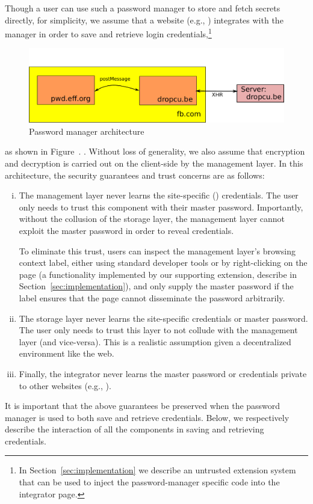 %
Though a user can use such a password manager to store and fetch secrets
directly, for simplicity, we assume that a website (e.g., )
integrates with the manager in order to save and retrieve login
credentials,\footnote{ In Section~\ref{sec:implementation} we describe an
  untrusted extension system that can be used to inject the password-manager
  specific code into the integrator page.  }
\iffigures
\begin{figure}
\begin{center}
\includegraphics[scale=0.35]{pmanager.pdf}
\end{center}
\vspace{-10pt}
\caption{\label{fig:manager-s-1} Password manager architecture}
\vspace{-10pt}
\end{figure}
 as shown in
Figure~.
\else
.
\fi
%
Without loss of generality, we also assume that encryption and
decryption is carried out on the client-side by the management layer.
%
In this architecture, the security guarantees and trust concerns
are as follows:
\begin{enumerate}[i)]
\item The management layer never learns the site-specific ()
  credentials. The user only needs to trust this component with their master
  password. Importantly, without the collusion of the storage layer, the
  management layer cannot exploit the master password in order to reveal
  credentials.

  To eliminate this trust, users can inspect the management layer's
  browsing context label, either using standard developer tools or by
  right-clicking on the page (a functionality implemented by our
  supporting extension, describe in Section~\ref{sec:implementation}),
  and only supply the master password if the label ensures that the
  page cannot disseminate the password arbitrarily.

\item The storage layer never learns the site-specific credentials or
  master password. The user only needs to trust this layer to not
  collude with the management layer (and vice-versa). This is a
  realistic assumption given a decentralized environment like the web.

\item Finally, the integrator never learns the master password or
  credentials private to other websites (e.g., ).
\end{enumerate}
%
It is important that the above guarantees be preserved when the
password manager is used to both save and retrieve credentials.
%
Below, we respectively describe the interaction of all the components
in saving and retrieving credentials.

